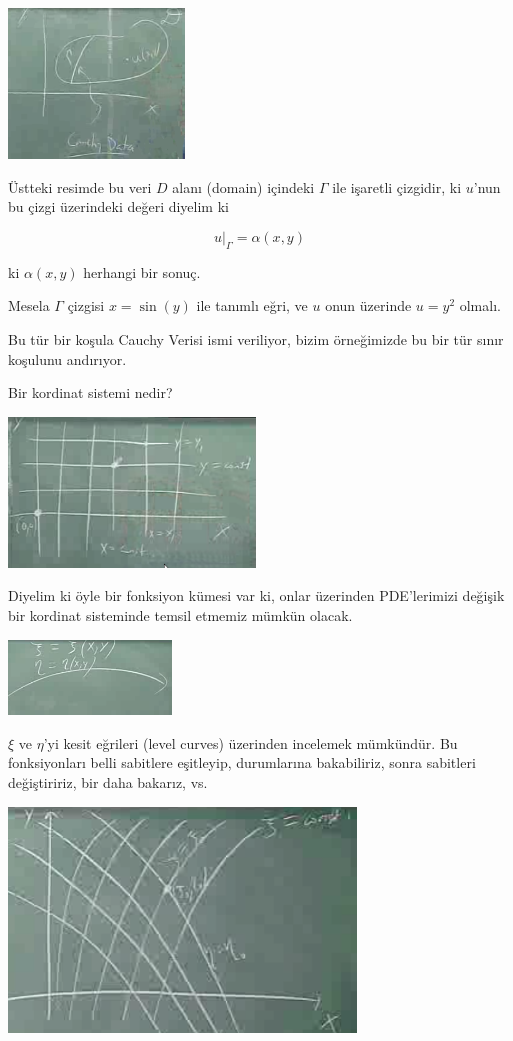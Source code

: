 \documentclass[12pt,fleqn]{article}\usepackage{../../common}
\begin{document}
\includegraphics[height=4cm]{1_11.png}

Üstteki resimde bu veri $D$ alanı (domain) içindeki $\Gamma$ ile işaretli
çizgidir, ki $u$'nun bu çizgi üzerindeki değeri diyelim ki

$$ u|_{\Gamma} = \alpha(x,y) $$

ki $\alpha(x,y)$ herhangi bir sonuç. 

Mesela $\Gamma$ çizgisi $x=\sin(y)$ ile tanımlı eğri, ve $u$ onun üzerinde
$u=y^2$ olmalı.

Bu tür bir koşula Cauchy Verisi ismi veriliyor, bizim örneğimizde bu bir
tür sınır koşulunu andırıyor.

Bir kordinat sistemi nedir? 

\includegraphics[height=4cm]{1_12.png}

Diyelim ki öyle bir fonksiyon kümesi var ki, onlar üzerinden PDE'lerimizi
değişik bir kordinat sisteminde temsil etmemiz mümkün olacak. 

\includegraphics[height=2cm]{1_13.png}

$\xi$ ve $\eta$'yi kesit eğrileri (level curves) üzerinden incelemek
mümkündür. Bu fonksiyonları belli sabitlere eşitleyip, durumlarına
bakabiliriz, sonra sabitleri değiştiririz, bir daha bakarız, vs. 

\includegraphics[height=6cm]{1_14.png}
\end{document}

